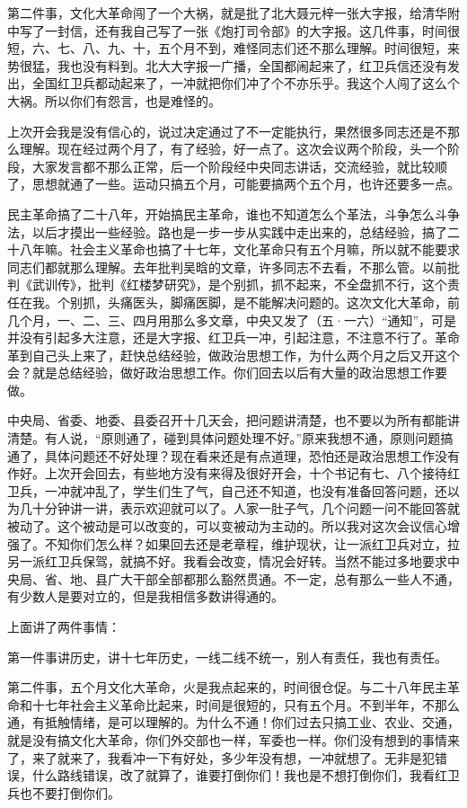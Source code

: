 第二件事，文化大革命闯了一个大祸，就是批了北大聂元梓一张大字报，给清华附中写了一封信，还有我自己写了一张《炮打司令部》的大字报。这几件事，时间很短，六、七、八、九、十，五个月不到，难怪同志们还不那么理解。时间很短，来势很猛，我也没有料到。北大大字报一广播，全国都闹起来了，红卫兵信还没有发出，全国红卫兵都动起来了，一冲就把你们冲了个不亦乐乎。我这个人闯了这么个大祸。所以你们有怨言，也是难怪的。

上次开会我是没有信心的，说过决定通过了不一定能执行，果然很多同志还是不那么理解。现在经过两个月了，有了经验，好一点了。这次会议两个阶段，头一个阶段，大家发言都不那么正常，后一个阶段经中央同志讲话，交流经验，就比较顺了，思想就通了一些。运动只搞五个月，可能要搞两个五个月，也许还要多一点。

民主革命搞了二十八年，开始搞民主革命，谁也不知道怎么个革法，斗争怎么斗争法，以后才摸出一些经验。路也是一步一步从实践中走出来的，总结经验，搞了二十八年嘛。社会主义革命也搞了十七年，文化革命只有五个月嘛，所以就不能要求同志们都就那么理解。去年批判吴晗的文章，许多同志不去看，不那么管。以前批判《武训传》，批判《红楼梦研究》，是个别抓，抓不起来，不全盘抓不行，这个责任在我。个别抓，头痛医头，脚痛医脚，是不能解决问题的。这次文化大革命，前几个月，一、二、三、四月用那么多文章，中央又发了（五·一六）“通知”，可是并没有引起多大注意，还是大字报、红卫兵一冲，引起注意，不注意不行了。革命革到自己头上来了，赶快总结经验，做政治思想工作，为什么两个月之后又开这个会？就是总结经验，做好政治思想工作。你们回去以后有大量的政治思想工作要做。

中央局、省委、地委、县委召开十几天会，把问题讲清楚，也不要以为所有都能讲清楚。有人说，“原则通了，碰到具体问题处理不好。”原来我想不通，原则问题搞通了，具体问题还不好处理？现在看来还是有点道理，恐怕还是政治思想工作没有作好。上次开会回去，有些地方没有来得及很好开会，十个书记有七、八个接待红卫兵，一冲就冲乱了，学生们生了气，自己还不知道，也没有准备回答问题，还以为几十分钟讲一讲，表示欢迎就可以了。人家一肚子气，几个问题一问不能回答就被动了。这个被动是可以改变的，可以变被动为主动的。所以我对这次会议信心增强了。不知你们怎么样？如果回去还是老章程，维护现状，让一派红卫兵对立，拉另一派红卫兵保驾，就搞不好。我看会改变，情况会好转。当然不能过多地要求中央局、省、地、县广大干部全部都那么豁然贯通。不一定，总有那么一些人不通，有少数人是要对立的，但是我相信多数讲得通的。

上面讲了两件事情：

第一件事讲历史，讲十七年历史，一线二线不统一，别人有责任，我也有责任。

第二件事，五个月文化大革命，火是我点起来的，时间很仓促。与二十八年民主革命和十七年社会主义革命比起来，时间是很短的，只有五个月。不到半年，不那么通，有抵触情绪，是可以理解的。为什么不通！你们过去只搞工业、农业、交通，就是没有搞文化大革命，你们外交部也一样，军委也一样。你们没有想到的事情来了，来了就来了，我看冲一下有好处，多少年没有想，一冲就想了。无非是犯错误，什么路线错误，改了就算了，谁要打倒你们！我也是不想打倒你们，我看红卫兵也不要打倒你们。

